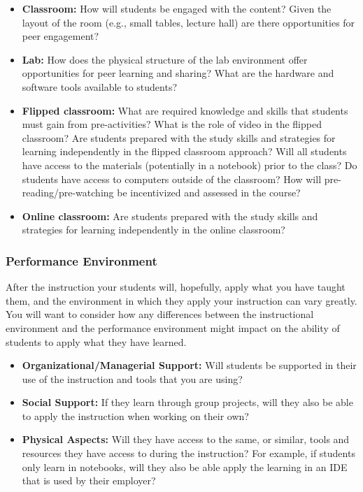 \documentclass[]{book}
\providecommand{\tightlist}{%
  \setlength{\itemsep}{0pt}\setlength{\parskip}{0pt}}
\begin{document}
\begin{itemize}
\tightlist
\item
  \textbf{Classroom:} How will students be engaged with the content?
  Given the layout of the room (e.g., small tables, lecture hall) are
  there opportunities for peer engagement?
\item
  \textbf{Lab:} How does the physical structure of the lab environment
  offer opportunities for peer learning and sharing? What are the
  hardware and software tools available to students?
\item
  \textbf{Flipped classroom:} What are required knowledge and skills
  that students must gain from pre-activities? What is the role of video
  in the flipped classroom? Are students prepared with the study skills
  and strategies for learning independently in the flipped classroom
  approach? Will all students have access to the materials (potentially
  in a notebook) prior to the class? Do students have access to
  computers outside of the classroom? How will pre-reading/pre-watching
  be incentivized and assessed in the course?
\item
  \textbf{Online classroom:} Are students prepared with the study skills
  and strategies for learning independently in the online classroom?
\end{itemize}

\subsubsection{Performance Environment}\label{performance-environment}

After the instruction your students will, hopefully, apply what you have
taught them, and the environment in which they apply your instruction
can vary greatly. You will want to consider how any differences between
the instructional environment and the performance environment might
impact on the ability of students to apply what they have learned.

\begin{itemize}
\tightlist
\item
  \textbf{Organizational/Managerial Support:} Will students be supported
  in their use of the instruction and tools that you are using?
\item
  \textbf{Social Support:} If they learn through group projects, will
  they also be able to apply the instruction when working on their own?
\item
  \textbf{Physical Aspects:} Will they have access to the same, or
  similar, tools and resources they have access to during the
  instruction? For example, if students only learn in notebooks, will
  they also be able apply the learning in an IDE that is used by their
  employer?
\end{itemize}
\end{document}
